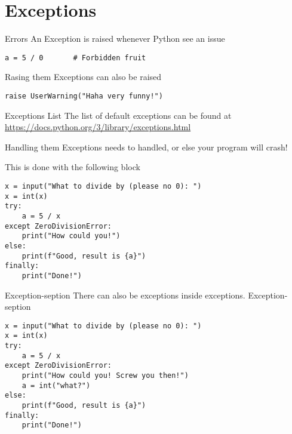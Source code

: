 \section{Exceptions}
\begin{frame}[containsverbatim]{Errors}
    An Exception is raised whenever Python see an issue

    \begin{verbatim}
a = 5 / 0       # Forbidden fruit
    \end{verbatim}
\end{frame}

\begin{frame}[containsverbatim]{Rasing them}
    Exceptions can also be raised

    \begin{verbatim}
raise UserWarning("Haha very funny!")
    \end{verbatim}
\end{frame}

\begin{frame}[containsverbatim]{Exceptions List}
    The list of default exceptions can be found at \url{https://docs.python.org/3/library/exceptions.html}
\end{frame}

\begin{frame}[containsverbatim]{Handling them}
    Exceptions needs to handled, or else your program will crash!

    This is done with the following block

    \begin{verbatim}
x = input("What to divide by (please no 0): ")
x = int(x)
try:
    a = 5 / x
except ZeroDivisionError:
    print("How could you!")
else:
    print(f"Good, result is {a}")
finally:
    print("Done!")
    \end{verbatim}
\end{frame}

\begin{frame}[containsverbatim]{Exception-seption}
    There can also be exceptions inside exceptions. Exception-seption

    \begin{verbatim}
x = input("What to divide by (please no 0): ")
x = int(x)
try:
    a = 5 / x
except ZeroDivisionError:
    print("How could you! Screw you then!")
    a = int("what?")
else:
    print(f"Good, result is {a}")
finally:
    print("Done!")
    \end{verbatim}
\end{frame}

